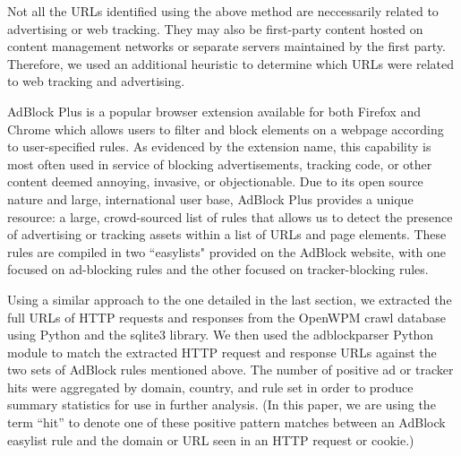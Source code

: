 \documentclass[conference]{IEEEtran}
\newcommand{\todo}[1]{}
\renewcommand{\todo}[1]{{\color{red} TODO: {#1}}}
\begin{document}
Not all the URLs identified using the above method are neccessarily related to advertising or web tracking.  They may also be first-party content hosted on content management networks or separate servers maintained by the first party.  Therefore, we used an additional heuristic to determine which URLs were related to web tracking and advertising.  

AdBlock Plus \cite{adblock} is a popular browser extension available for both Firefox and Chrome which allows users to filter and block elements on a webpage according to user-specified rules. As evidenced by the extension name, this capability is most often used in service of blocking advertisements, tracking code, or other content deemed annoying, invasive, or objectionable. Due to its open source nature and large, international user base, AdBlock Plus provides a unique resource: a large, crowd-sourced list of rules that allows us to detect the presence of advertising or tracking assets within a list of URLs and page elements. These rules are compiled in two ``easylists"  \cite{easylist} provided on the AdBlock website, with one focused on ad-blocking rules and the other focused on tracker-blocking rules.

Using a similar approach to the one detailed in the last section, we extracted the full URLs of HTTP requests and responses from the OpenWPM crawl database using Python and the sqlite3 library. We then used the adblockparser  \cite{adblockparser} Python module to match the extracted HTTP request and response URLs against the two sets of AdBlock rules mentioned above. The number of positive ad or tracker hits were aggregated by domain, country, and rule set in order to produce summary statistics for use in further analysis. (In this paper, we are using the term ``hit'' to denote one of these positive pattern matches between an AdBlock easylist rule and the domain or URL seen in an HTTP request or cookie.)
\end{document}
